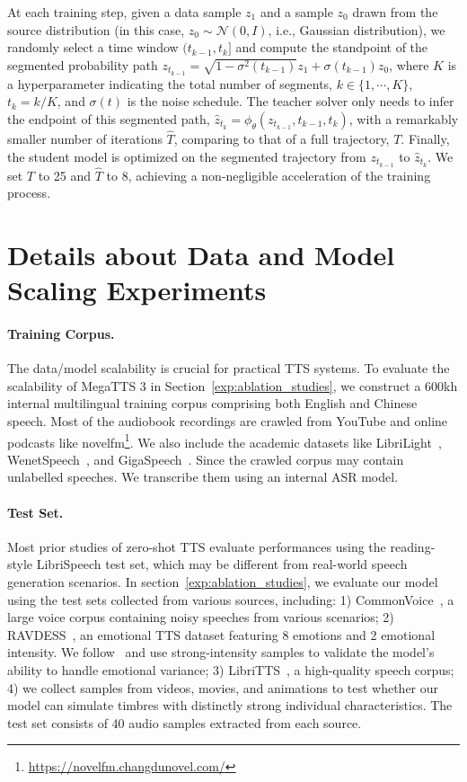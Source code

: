 At each training step, given a data sample $z_1$ and a sample $z_0$ drawn from the source distribution (in this case, $z_0 \sim \mathcal{N}(0, I)$, i.e., Gaussian distribution), we randomly select a time window $(t_{k-1}, t_{k}]$ and compute the standpoint of the segmented probability path $z_{t_{k-1}} = \sqrt{1 - \sigma^2(t_{k-1})} z_1 + \sigma(t_{k-1}) z_0$, where $K$ is a hyperparameter indicating the total number of segments, $k\in\{1,\cdots,K\}$, $t_k = k / K$, and $\sigma(t)$ is the noise schedule. The teacher solver only needs to infer the endpoint of this segmented path, $\hat{z}_{t_k} = \phi_{\theta}(z_{t_{k-1}}, t_{k-1}, t_{k})$, with a remarkably smaller number of iterations $\widehat{T}$, comparing to that of a full trajectory, $T$. Finally, the student model is optimized on the segmented trajectory from $z_{t_{k-1}}$ to $\hat{z}_{t_k}$. We set $T$ to 25 and $\widehat{T}$ to 8, achieving a non-negligible acceleration of the training process.


\section{Details about Data and Model Scaling Experiments}
\label{app:data_model_scaling}

\paragraph{Training Corpus.} The data/model scalability is crucial for practical TTS systems. To evaluate the scalability of MegaTTS 3 in Section~\ref{exp:ablation_studies}, we construct a 600kh internal multilingual training corpus comprising both English and Chinese speech. Most of the audiobook recordings are crawled from YouTube and online podcasts like novelfm\footnote{\url{https://novelfm.changdunovel.com/}}. We also include the academic datasets like LibriLight~\citep{kahn2020libri}, WenetSpeech~\citep{zhang2022wenetspeech}, and GigaSpeech~\citep{chen2021gigaspeech}. Since the crawled corpus may contain unlabelled speeches. We transcribe them using an internal ASR model. 

\paragraph{Test Set.} Most prior studies of zero-shot TTS evaluate performances using the reading-style LibriSpeech test set, which may be different from real-world speech generation scenarios. In section~\ref{exp:ablation_studies}, we evaluate our model using the test sets collected from various sources, including: 1) CommonVoice~\citep{ardila2019common}, a large voice corpus containing noisy speeches from various scenarios; 2) RAVDESS~\citep{livingstone2018ryerson}, an emotional TTS dataset featuring 8 emotions and 2 emotional intensity. We follow~\citet{ju2024naturalspeech} and use strong-intensity samples to validate the model’s ability to handle emotional variance; 3) LibriTTS~\citep{zen2019libritts}, a high-quality speech corpus; 4) we collect samples from videos, movies, and animations to test whether our model can simulate timbres with distinctly strong individual characteristics. The test set consists of 40 audio samples extracted from each source.

